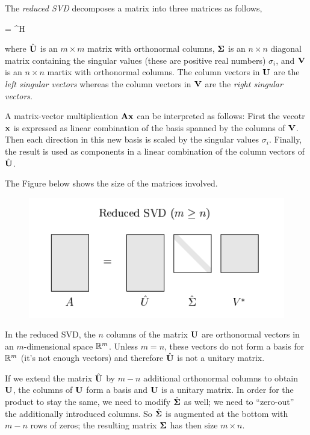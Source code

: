 
The \emph{reduced SVD} decomposes a matrix into three matrices as follows,

\bee
\Abf = \hat\Ubf \hat\Sigmabf \Vbf^H
\eee

where $\hat{\mathbf{U}}$ is an $m \times m$ matrix with orthonormal columns, $\mathbf{\Sigma}$ is an $n \times n$ diagonal matrix containing the singular values (these are positive real numbers) $\sigma_i$, and $\mathbf{V}$ is an $n \times n$ martix with orthonormal columns. The column vectors in $\mathbf{U}$ are the \emph{left singular vectors} whereas the column vectors in $\mathbf{V}$ are the \emph{right singular vectors}.

A matrix-vector multiplication $\mathbf{A} \mathbf{x}$ can be interpreted as follows: First the vecotr $\mathbf{x}$ is expressed  as linear combination of the basis spanned by the columns of $\mathbf{V}$. Then each direction in this new basis is scaled by the singular values $\sigma_i$. Finally, the result is used as components in a linear combination of the column vectors of $\hat{\mathbf{U}}$.

The Figure below shows the size of the matrices involved.

\begin{figure}[hbt!]
\centering
\includegraphics[scale=0.5]{images/num_lin_algebra_03_1.png}
\end{figure}

In the reduced SVD, the $n$ columns of the matrix $\mathbf{U}$ are orthonormal vectors in an $m$-dimensional space $\mathbb{R}^m$. Unless $m = n$, these vectors do not form a basis for $\mathbb{R}^m$ (it's not enough vectors) and therefore $\hat{\mathbf{U}}$ is not a unitary matrix.

If we extend the matrix $\hat{\mathbf{U}}$ by $m-n$ additional orthonormal columns to obtain $\mathbf{U}$, the columns of $\mathbf{U}$ form a basis and $\mathbf{U}$ is a unitary matrix. In order for the product to stay the same, we need to modify $\hat{\mathbf{\Sigma}}$ as well; we need to ``zero-out'' the additionally introduced columns. So $\hat{\mathbf{\Sigma}}$ is augmented at the bottom with $m-n$ rows of zeros; the resulting matrix $\mathbf{\Sigma}$ has then size $m \times n$.


